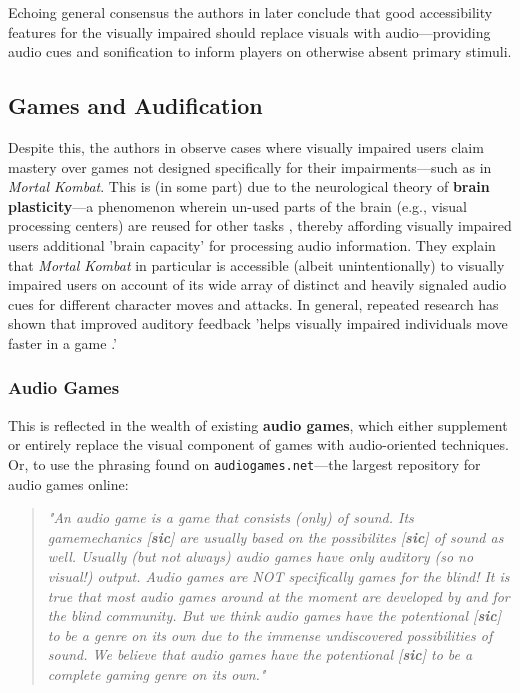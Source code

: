 \documentclass{report}
\newcommand{\tech}[1]{\textbf{#1}}
\begin{document}
Echoing general consensus the authors in \cite{yuan2011game} later conclude that good accessibility features for the visually impaired should replace visuals with audio---providing audio cues and sonification to inform players on otherwise absent primary stimuli.

\subsection{Games and Audification}
Despite this, the authors in \cite{prazaru2020overview} observe cases where visually impaired users claim mastery over games not designed specifically for their impairments---such as in \emph{Mortal Kombat}. This is (in some part) due to the neurological theory of \tech{brain plasticity}---a phenomenon wherein un-used parts of the brain (e.g., visual processing centers) are reused for other tasks \cite{nudo2006plasticity}, thereby affording visually impaired users additional 'brain capacity' for processing audio information. They explain that \emph{Mortal Kombat} in particular is accessible (albeit unintentionally) to visually impaired users on account of its wide array of distinct and heavily signaled audio cues for different character moves and attacks. In general, repeated research has shown that improved auditory feedback 'helps visually impaired individuals move faster in a game \cite{agrimi2024game}.'

\subsubsection{Audio Games}

This is reflected in the wealth of existing \tech{audio games}, which either supplement or entirely replace the visual component of games with audio-oriented techniques. Or, to use the phrasing found on \texttt{audiogames.net}---the largest repository for audio games online: 

\begin{quote}
\emph{"An audio game is a game that consists (only) of sound. Its gamemechanics [\tech{sic}] are usually based on the possibilites [\tech{sic}] of sound as well. Usually (but not always) audio games have only auditory (so no visual!) output. Audio games are NOT specifically games for the blind! It is true that most audio games around at the moment are developed by and for the blind community. But we think audio games have the potentional [\tech{sic}] to be a genre on its own due to the immense undiscovered possibilities of sound. We believe that audio games have the potentional [\tech{sic}] to be a complete gaming genre on its own."} \cite{Audiogames}    
\end{quote}
\end{document}
